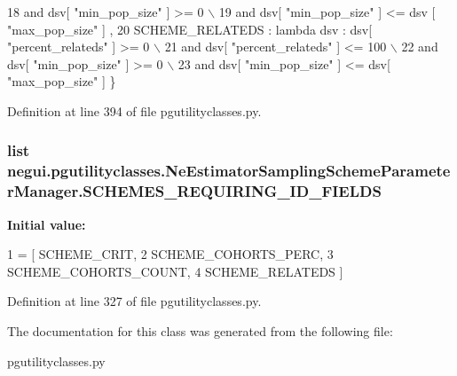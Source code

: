 \begin{DoxyCode}
18                                         \textcolor{keywordflow}{and} dsv[ \textcolor{stringliteral}{"min\_pop\_size"} ] >= 0 \(\backslash\)
19                                         \textcolor{keywordflow}{and} dsv[ \textcolor{stringliteral}{"min\_pop\_size"} ] <= dsv [ \textcolor{stringliteral}{"max\_pop\_size"} ] ,
20                     SCHEME\_RELATEDS : \textcolor{keyword}{lambda} dsv : dsv[  \textcolor{stringliteral}{"percent\_relateds"} ] >= 0 \(\backslash\)
21                                         \textcolor{keywordflow}{and} dsv[ \textcolor{stringliteral}{"percent\_relateds"} ] <= 100 \(\backslash\)
22                                         \textcolor{keywordflow}{and} dsv[ \textcolor{stringliteral}{"min\_pop\_size"} ] >= 0 \(\backslash\)
23                                         \textcolor{keywordflow}{and} dsv[ \textcolor{stringliteral}{"min\_pop\_size"} ] <= dsv[ \textcolor{stringliteral}{"max\_pop\_size"} ] \}
\end{DoxyCode}


Definition at line 394 of file pgutilityclasses.\+py.

\subsubsection[{\texorpdfstring{S\+C\+H\+E\+M\+E\+S\+\_\+\+R\+E\+Q\+U\+I\+R\+I\+N\+G\+\_\+\+I\+D\+\_\+\+F\+I\+E\+L\+DS}{SCHEMES_REQUIRING_ID_FIELDS}}]{\setlength{\rightskip}{0pt plus 5cm}list negui.\+pgutilityclasses.\+Ne\+Estimator\+Sampling\+Scheme\+Parameter\+Manager.\+S\+C\+H\+E\+M\+E\+S\+\_\+\+R\+E\+Q\+U\+I\+R\+I\+N\+G\+\_\+\+I\+D\+\_\+\+F\+I\+E\+L\+DS\hspace{0.3cm}{\ttfamily [static]}}\hypertarget{classnegui_1_1pgutilityclasses_1_1NeEstimatorSamplingSchemeParameterManager_a6f6cdc4cfcf5a3be91a81f40f7057ae4}{}\label{classnegui_1_1pgutilityclasses_1_1NeEstimatorSamplingSchemeParameterManager_a6f6cdc4cfcf5a3be91a81f40f7057ae4}
{\bfseries Initial value\+:}
\begin{DoxyCode}
1 = [ SCHEME\_CRIT, 
2                                     SCHEME\_COHORTS\_PERC, 
3                                      SCHEME\_COHORTS\_COUNT,
4                                         SCHEME\_RELATEDS ]
\end{DoxyCode}


Definition at line 327 of file pgutilityclasses.\+py.



The documentation for this class was generated from the following file\+:\begin{DoxyCompactItemize}
\item 
pgutilityclasses.\+py\end{DoxyCompactItemize}
